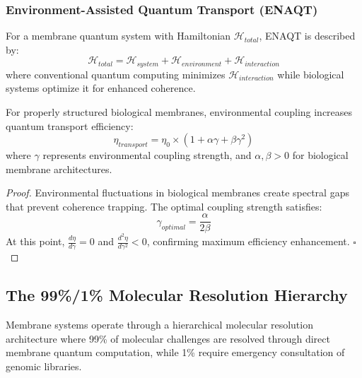 ﻿\documentclass[11pt,a4paper]{article}
\begin{document}
\subsubsection{Environment-Assisted Quantum Transport (ENAQT)}

\begin{definition}
For a membrane quantum system with Hamiltonian $\mathcal{H}_{total}$, ENAQT is described by:
\begin{equation}
\mathcal{H}_{total} = \mathcal{H}_{system} + \mathcal{H}_{environment} + \mathcal{H}_{interaction}
\end{equation}
where conventional quantum computing minimizes $\mathcal{H}_{interaction}$ while biological systems optimize it for enhanced coherence.
\end{definition}

\begin{theorem}
For properly structured biological membranes, environmental coupling increases quantum transport efficiency:
\begin{equation}
\eta_{transport} = \eta_0 \times (1 + \alpha \gamma + \beta \gamma^2)
\end{equation}
where $\gamma$ represents environmental coupling strength, and $\alpha, \beta > 0$ for biological membrane architectures.
\end{theorem}

\begin{proof}
Environmental fluctuations in biological membranes create spectral gaps that prevent coherence trapping. The optimal coupling strength satisfies:
\begin{equation}
\gamma_{optimal} = \frac{\alpha}{2\beta}
\end{equation}
At this point, $\frac{d\eta}{d\gamma} = 0$ and $\frac{d^2\eta}{d\gamma^2} < 0$, confirming maximum efficiency enhancement. $\square$
\end{proof}

\subsection{The 99\%/1\% Molecular Resolution Hierarchy}

Membrane systems operate through a hierarchical molecular resolution architecture where 99\% of molecular challenges are resolved through direct membrane quantum computation, while 1\% require emergency consultation of genomic libraries.
\end{document}
